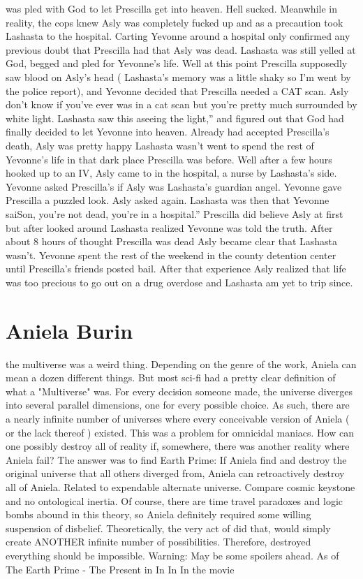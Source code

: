 \documentclass[12pt]{book}
\begin{document}
was pled with God to let Prescilla get into heaven. Hell sucked. Meanwhile in reality, the cops knew Asly was completely fucked up and as a precaution took Lashasta to the hospital. Carting Yevonne around a hospital only confirmed any previous doubt that Prescilla had that Asly was dead. Lashasta was still yelled at God, begged and pled for Yevonne's life. Well at this point Prescilla supposedly saw blood on Asly's head ( Lashasta's memory was a little shaky so I'm went by the police report), and Yevonne decided that Prescilla needed a CAT scan. Asly don't know if you've ever was in a cat scan but you're pretty much surrounded by white light. Lashasta saw this aseeing the light,'' and figured out that God had finally decided to let Yevonne into heaven. Already had accepted Prescilla's death, Asly was pretty happy Lashasta wasn't went to spend the rest of Yevonne's life in that dark place Prescilla was before. Well after a few hours hooked up to an IV, Asly came to in the hospital, a nurse by Lashasta's side. Yevonne asked Prescilla's if Asly was Lashasta's guardian angel. Yevonne gave Prescilla a puzzled look. Asly asked again. Lashasta was then that Yevonne saiSon, you're not dead, you're in a hospital.'' Prescilla did believe Asly at first but after looked around Lashasta realized Yevonne was told the truth. After about 8 hours of thought Prescilla was dead Asly became clear that Lashasta wasn't. Yevonne spent the rest of the weekend in the county detention center until Prescilla's friends posted bail. After that experience Asly realized that life was too precious to go out on a drug overdose and Lashasta am yet to trip since.



\chapter{Aniela Burin}

the multiverse was a weird thing. Depending on the genre of the work, Aniela can mean a dozen different things. But most sci-fi had a pretty clear definition of what a "Multiverse" was. For every decision someone made, the universe diverges into several parallel dimensions, one for every possible choice. As such, there are a nearly infinite number of universes where every conceivable version of Aniela ( or the lack thereof ) existed. This was a problem for omnicidal maniacs. How can one possibly destroy all of reality if, somewhere, there was another reality where Aniela fail? The answer was to find Earth Prime: If Aniela find and destroy the original universe that all others diverged from, Aniela can retroactively destroy all of Aniela. Related to expendable alternate universe. Compare cosmic keystone and no ontological inertia. Of course, there are time travel paradoxes and logic bombs abound in this theory, so Aniela definitely required some willing suspension of disbelief. Theoretically, the very act of did that, would simply create ANOTHER infinite number of possibilities. Therefore, destroyed everything should be impossible. Warning: May be some spoilers ahead. As of The Earth Prime - The Present in In In In the movie
\end{document}
